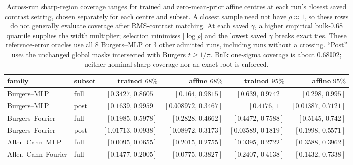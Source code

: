 \begin{table}[t]
\centering\footnotesize\setlength{\tabcolsep}{4pt}


\begin{tabular}{@{}llrrrr@{}}
\toprule
family & subset & trained $68\%$ & affine $68\%$ & trained $95\%$ & affine $95\%$ \\
\midrule
Burgers--MLP & full & $[0.3427,\,0.8605]$ & $[0.164,\,0.9815]$ & $[0.639,\,0.9742]$ & $[0.298,\,0.995]$ \\
Burgers--MLP & post & $[0.1639,\,0.9959]$ & $[0.008972,\,0.3467]$ & $[0.4176,\,1]$ & $[0.01387,\,0.7121]$ \\
Burgers--Fourier & full & $[0.1985,\,0.5978]$ & $[0.2828,\,0.4662]$ & $[0.4472,\,0.7588]$ & $[0.5145,\,0.742]$ \\
Burgers--Fourier & post & $[0.01713,\,0.0938]$ & $[0.08972,\,0.3173]$ & $[0.03589,\,0.1819]$ & $[0.1998,\,0.5571]$ \\
Allen--Cahn--MLP & full & $[0.0095,\,0.0655]$ & $[0.2015,\,0.2755]$ & $[0.0395,\,0.2722]$ & $[0.3588,\,0.3962]$ \\
Allen--Cahn--Fourier & full & $[0.1477,\,0.2005]$ & $[0.0775,\,0.3827]$ & $[0.2407,\,0.4138]$ & $[0.1432,\,0.7338]$ \\
\bottomrule
\end{tabular}
\caption{Across-run sharp-region coverage ranges for trained and zero-mean-prior affine centres at each run's closest saved contrast setting, chosen separately for each centre and subset. A closest sample need not have $\rho\approx1$, so these rows do not generally evaluate coverage after RMS-contrast matching. At each saved $\gamma$, a higher empirical bulk-$0.68$ quantile supplies the width multiplier; selection minimises $|\log\rho|$ and the lowest saved $\gamma$ breaks exact ties. These reference-error oracles use all $8$ Burgers--MLP or $3$ other admitted runs, including runs without a crossing. ``Post'' uses the unchanged global masks intersected with Burgers $t\ge1/\pi$. Bulk one-sigma coverage is about $0.68002$; neither nominal sharp coverage nor an exact root is enforced.}
\label{tab:r2-oracle}
\end{table}
